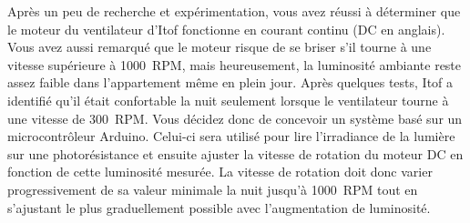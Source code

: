 \documentclass[english,french,12pt]{article}
\begin{document}
Après un peu de recherche et expérimentation, vous avez réussi à déterminer que le moteur du ventilateur d’Itof fonctionne en courant continu (DC en anglais). Vous avez aussi remarqué que le moteur risque de se briser s'il tourne à une vitesse supérieure à 1000~RPM, mais heureusement, la luminosité ambiante reste assez faible dans l'appartement même en plein jour. Après quelques tests, Itof a identifié qu’il était confortable la nuit seulement lorsque le ventilateur tourne à une vitesse de 300~RPM. Vous décidez donc de concevoir un système basé sur un microcontrôleur Arduino. Celui-ci sera utilisé pour lire l'irradiance de la lumière sur une photorésistance et ensuite ajuster la vitesse de rotation du moteur DC en fonction de cette luminosité mesurée. La vitesse de rotation doit donc varier progressivement de sa valeur minimale la nuit jusqu'à 1000~RPM tout en s'ajustant le plus graduellement possible avec l'augmentation de luminosité.

\end{document}
